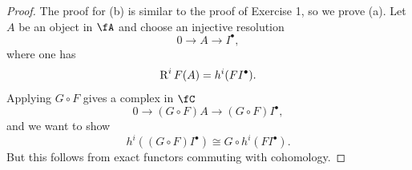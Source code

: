 \documentclass[a4paper]{article}
\begin{document}
\begin{enumerate} [label=\textbf{\arabic*.}, leftmargin=0em]
        \begin{proof}
          The proof for (b) is similar to the proof of Exercise 1, so we prove (a).
          Let $A$ be an object in $\fA$ and choose an injective resolution
          \begin{equation*}
            0 \to A \to I^\bullet,
          \end{equation*}
          where one has
          \begin{equation*}
            \operatorname{R}^iF(A) = h^i(FI^\bullet).
          \end{equation*}
          Applying $G \circ F$ gives a complex in $\fC$
          \begin{equation*}
            0 \to (G \circ F)A \to (G \circ F) I^\bullet,
          \end{equation*}
          and we want to show
          \begin{equation*}
            h^i((G \circ F)I^\bullet) \cong G \circ h^i(FI^\bullet).
          \end{equation*}
          But this follows from exact functors commuting with cohomology.

        \end{proof}

\end{enumerate}
\end{document}
